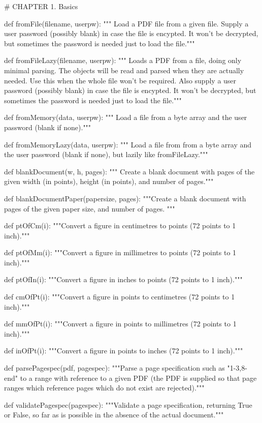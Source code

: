 # CHAPTER 1. Basics

def fromFile(filename, userpw):
    """ Load a PDF file from a given file.
    Supply a user password (possibly blank) in case the file is encypted. It
    won't be decrypted, but sometimes the password is needed just to load the
    file."""

def fromFileLazy(filename, userpw):
    """ Loads a PDF from a file, doing only
    minimal parsing. The objects will be read and parsed when they are actually
    needed.  Use this when the whole file won't be required. Also supply a user
    password (possibly blank) in case the file is encypted. It won't be
    decrypted, but sometimes the password is needed just to load the file."""

def fromMemory(data, userpw):
    """ Load a file from a byte array and the user password (blank if none)."""

def fromMemoryLazy(data, userpw):
    """ Load a file from from a byte array and the user password (blank if
    none), but lazily like fromFileLazy."""

def blankDocument(w, h, pages):
    """ Create a blank document
    with pages of the given width (in points), height (in points), and number
    of pages."""

def blankDocumentPaper(papersize, pages):
    """Create a blank document with pages of the given paper size, and number
    of pages. """

def ptOfCm(i):
    """Convert a figure in centimetres to points (72 points to 1 inch)."""

def ptOfMm(i):
    """Convert a figure in millimetres to points (72 points to 1 inch)."""

def ptOfIn(i):
    """Convert a figure in inches to points (72 points to 1 inch)."""

def cmOfPt(i):
    """Convert a figure in points to centimetres (72 points to 1 inch)."""

def mmOfPt(i):
    """Convert a figure in points to millimetres (72 points to 1 inch)."""

def inOfPt(i):
    """Convert a figure in points to inches (72 points to 1 inch)."""

def parsePagespec(pdf, pagespec):
    """Parse a page specification such as "1-3,8-end" to a range with reference to
    a given PDF (the PDF is supplied so that page ranges which reference pages
    which do not exist are rejected)."""

def validatePagespec(pagespec):
    """Validate a page specification, returning True or False, so far as is
    possible in the absence of the actual document."""

